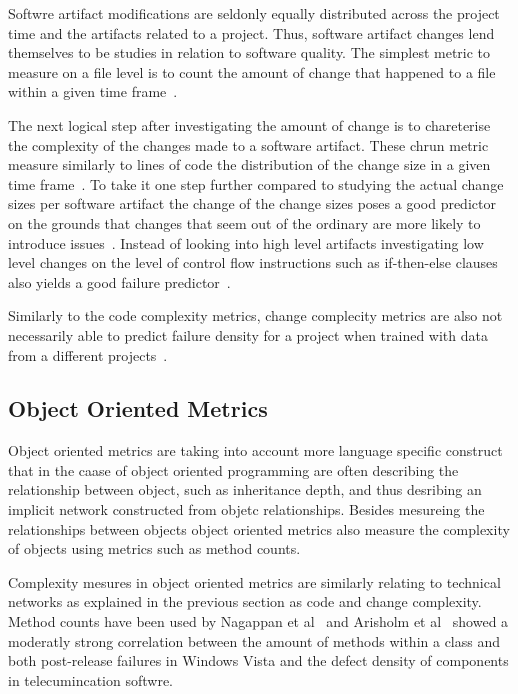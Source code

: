 Softwre artifact modifications are seldonly equally distributed across the project time and the artifacts related to a project.
Thus, software artifact changes lend themselves to be studies in relation to software quality.
The simplest metric to measure on a file level is to count the amount of change that happened to a file within a given time frame~\cite{li:metrics:2005,moser:icse:2008,cataldo:icse:2011}.

The next logical step after investigating the amount of change is to chareterise the complexity of the changes made to a software artifact. 
These chrun metric measure similarly to lines of code the distribution of the change size in a given time frame~\cite{nagappan:icse:2005,shihab:fse:2011,zimmermann:fse:2009,bell:promise:2011}.
To take it one step further compared to studying the actual change sizes per software artifact the change of the change sizes poses a good predictor on the grounds that changes that seem out of the ordinary are more likely to introduce issues~\cite{hassan:icse:2009}.
Instead of looking into high level artifacts investigating low level changes on the level of control flow instructions such as if-then-else clauses also yields a good failure predictor~\cite{giger:msr:2011}.

Similarly to the code complexity metrics, change complecity metrics are also not necessarily able to predict failure density for a project when trained with data from a different projects~\cite{zimmermann:fse:2009}.


\subsection{Object Oriented Metrics}
\label{chap:6:sub:oom}
Object oriented metrics are taking into account more language specific construct that in the caase of object oriented programming are often describing the relationship between object, such as inheritance depth, and thus desribing an implicit network constructed from objetc relationships.
Besides mesureing the relationships between objects object oriented metrics also measure the complexity of objects using metrics such as method counts.

Complexity mesures in object oriented metrics are similarly relating to technical networks as explained in the previous section as code and change complexity.
Method counts have been used by Nagappan et al~\cite{nagappan:icse:2006} and Arisholm et al~\cite{arisholm:isese:2006} showed a moderatly strong correlation between the amount of methods within a class and both post-release failures in Windows Vista and the defect density of components in telecumincation softwre.

